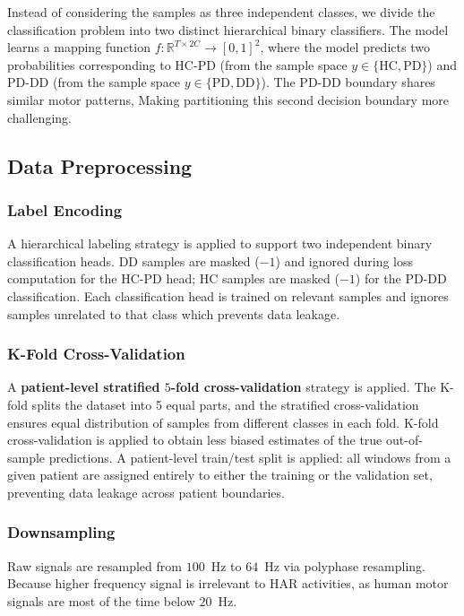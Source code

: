 \documentclass[conference]{IEEEtran}
\begin{document}
Instead of considering the samples as three independent classes, we divide the classification problem into two distinct hierarchical binary classifiers. The model learns a mapping function
$f : \mathbb{R}^{T \times 2C} \rightarrow [0,1]^2$, where the model predicts two probabilities corresponding to HC-PD (from the sample space $y \in \{\text{HC}, \text{PD}\}$) and PD-DD (from the sample space $y \in \{\text{PD}, \text{DD}\}$).
The PD-DD boundary shares similar motor patterns, Making partitioning this second decision boundary more challenging.

\subsection{Data Preprocessing}

\subsubsection{Label Encoding}
A hierarchical labeling strategy is applied to support two independent binary classification heads. DD samples are masked ($-1$) and ignored during loss computation for the HC-PD head; HC samples are masked ($-1$) for the PD-DD classification. Each classification head is trained on relevant samples and ignores samples unrelated to that class which prevents data leakage.

\subsubsection{K-Fold Cross-Validation}
A \textbf{patient-level stratified $5$-fold cross-validation} strategy is applied. The K-fold splits the dataset into 5 equal parts, and the stratified cross-validation ensures equal distribution of samples from different classes in each fold. K-fold cross-validation is applied to obtain less biased estimates of the true out-of-sample predictions. A patient-level train/test split is applied: all windows from a given patient are assigned entirely to either the training or the validation set, preventing data leakage across patient boundaries.

\subsubsection{Downsampling}
Raw signals are resampled from $100$~Hz to $64$~Hz via polyphase resampling. Because higher frequency signal is irrelevant to HAR activities, as human motor signals are most of the time below $20$~Hz.
\end{document}
